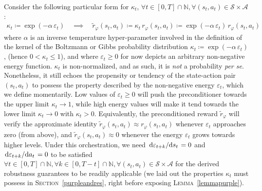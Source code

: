 Consider the following particular form for $\kappa_t$,
$\forall t \in [0, T] \cap \mathbb{N},
\forall (s_t, a_t) \in \mathcal{S} \times \mathcal{A}$:
\begin{align}
\kappa_t \coloneqq \exp (-\alpha \, \varepsilon_t)
\quad \implies \quad
\tilde{r}_\varphi (s_t,a_t)
\coloneqq \kappa_t \, r_\varphi (s_t,a_t)
\coloneqq \exp (-\alpha \, \varepsilon_t) \, r_\varphi (s_t,a_t)
\label{precondrewexp}
\end{align}
where $\alpha$ is an inverse temperature hyper-parameter involved in the definition of the kernel of
the Boltzmann or Gibbs probability distribution $\kappa_t \coloneqq \exp (-\alpha \, \varepsilon_t)$,
(hence $0 < \kappa_t \leq 1$), and where
$\varepsilon_t \geq 0$ for now depicts an arbitrary non-negative energy function.
$\kappa_t$ is non-normalized, and as such, it is \emph{not} a probability \textit{per se}.
Nonetheless, it still echoes the propensity or tendency of the state-action pair $(s_t,a_t)$
to possess the property described by the non-negative energy $\varepsilon_t$, which we define momentarily.
Low values of $\varepsilon_t \geq 0$
will push the preconditioner towards the upper limit $\kappa_t \to 1$,
while high energy values will make it tend towards the lower limit $\kappa_t \to 0$ with $\kappa_t > 0$.
Equivalently, the preconditioned reward $\tilde{r}_\varphi$ will verify the approximate identity
$\tilde{r}_\varphi (s_t,a_t) \approx r_\varphi (s_t,a_t)$ whenever $\varepsilon_t$
approaches zero (from above), and $\tilde{r}_\varphi (s_t,a_t) \approx 0$ whenever
the energy $\varepsilon_t$ grows towards higher levels.
Under this orchestration, we need
$\dv*{\varepsilon_{t+k}}{s_t} = 0$ and $\dv*{\varepsilon_{t+k}}{a_t} = 0$
to be satisfied
$\forall t \in [0, T] \cap \mathbb{N}, \forall k \in [0, T-t] \cap \mathbb{N},
\forall (s_t, a_t) \in \mathcal{S} \times \mathcal{A}$
for the derived robustness guarantees to be readily applicable
(we laid out the properties $\kappa_t$ must possess in \textsc{Section}~\ref{purpleandres},
right before exposing \textsc{Lemma}~\ref{lemmapurple}).

